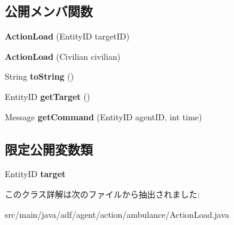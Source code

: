 \subsection*{公開メンバ関数}
\begin{DoxyCompactItemize}
\item 
\hypertarget{classadf_1_1agent_1_1action_1_1ambulance_1_1ActionLoad_afb8c917e4bdfcef0e6083e3c89709aa7}{}\label{classadf_1_1agent_1_1action_1_1ambulance_1_1ActionLoad_afb8c917e4bdfcef0e6083e3c89709aa7} 
{\bfseries Action\+Load} (Entity\+ID target\+ID)
\item 
\hypertarget{classadf_1_1agent_1_1action_1_1ambulance_1_1ActionLoad_a5dedd5ce60d85b8dfc1ed698b59f9927}{}\label{classadf_1_1agent_1_1action_1_1ambulance_1_1ActionLoad_a5dedd5ce60d85b8dfc1ed698b59f9927} 
{\bfseries Action\+Load} (Civilian civilian)
\item 
\hypertarget{classadf_1_1agent_1_1action_1_1ambulance_1_1ActionLoad_abef023f9c55eced92f5c1f6b99cd76a1}{}\label{classadf_1_1agent_1_1action_1_1ambulance_1_1ActionLoad_abef023f9c55eced92f5c1f6b99cd76a1} 
String {\bfseries to\+String} ()
\item 
\hypertarget{classadf_1_1agent_1_1action_1_1ambulance_1_1ActionLoad_a01c6dcdb32d5b04b355a52c74fcab728}{}\label{classadf_1_1agent_1_1action_1_1ambulance_1_1ActionLoad_a01c6dcdb32d5b04b355a52c74fcab728} 
Entity\+ID {\bfseries get\+Target} ()
\item 
\hypertarget{classadf_1_1agent_1_1action_1_1ambulance_1_1ActionLoad_a28c77b2dc4e23671af98d958c39988c9}{}\label{classadf_1_1agent_1_1action_1_1ambulance_1_1ActionLoad_a28c77b2dc4e23671af98d958c39988c9} 
Message {\bfseries get\+Command} (Entity\+ID agent\+ID, int time)
\end{DoxyCompactItemize}
\subsection*{限定公開変数類}
\begin{DoxyCompactItemize}
\item 
\hypertarget{classadf_1_1agent_1_1action_1_1ambulance_1_1ActionLoad_a6146d26a2100734e0794bc4dfa408a24}{}\label{classadf_1_1agent_1_1action_1_1ambulance_1_1ActionLoad_a6146d26a2100734e0794bc4dfa408a24} 
Entity\+ID {\bfseries target}
\end{DoxyCompactItemize}


このクラス詳解は次のファイルから抽出されました\+:\begin{DoxyCompactItemize}
\item 
src/main/java/adf/agent/action/ambulance/Action\+Load.\+java\end{DoxyCompactItemize}
